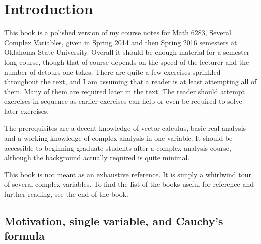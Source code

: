 \documentclass[12pt,openany]{book}
\theoremstyle{plain}
\theoremstyle{remark}
\theoremstyle{definition}
\theoremstyle{exercise}
\theoremstyle{example}
\newcommand{\chapterref}[1]{\hyperref[#1]{chapter~\ref*{#1}}}
\begin{document}

\chapter*{Introduction}


This book is a polished version of my course notes for Math 6283, Several
Complex Variables, given in
Spring 2014 and then Spring 2016 semesters at Oklahoma State University.
Overall it should be enough material for a semester-long course, though that
of course depends on the speed of the lecturer and the number of detours one
takes.  There are quite a few
exercises sprinkled throughout the text, and I am assuming that a reader is
at least attempting all of them.  Many of them are required later in the
text.  The reader should attempt exercises in sequence as earlier exercises
can help or even be required to solve later exercises.

The prerequisites are a decent knowledge of vector calculus, basic
real-analysis and a working knowledge of complex analysis in one variable.
It should be accessible to beginning graduate students after a complex
analysis course, although the background actually required is quite minimal.

This book is not meant as an exhaustive reference.  It is simply a whirlwind
tour of several complex variables.  To find the list of the books useful for
reference and further reading, see the end of the book.


\section{Motivation, single variable, and Cauchy's formula} \label{sec:motivation}
\end{document}
